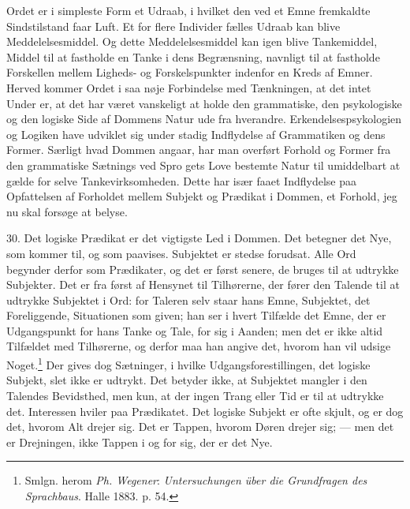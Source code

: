 \documentclass[12pt,a4paper]{book}
\newcommand{\opage}[1]{\marginnote{\footnotesize\textit{[#1]}}}
\begin{document}
Ordet er i simpleste Form et Udraab, i hvilket den ved et Emne
fremkaldte Sindstilstand faar Luft. Et for flere Individer fælles Udraab
kan blive Meddelelsesmiddel. Og dette Meddelelsesmiddel kan igen blive
Tankemiddel, Middel til at fastholde en Tanke i dens Begrænsning,
navnligt til at fastholde Forskellen mellem Ligheds- og Forskelspunkter
indenfor en Kreds af Emner. Herved kommer Ordet i saa nøje Forbindelse
med Tænkningen, at det intet Under er, at det har været vanskeligt at
holde den grammatiske, den psykologiske og den logiske Side af Dommens
Natur ude fra hverandre. Erkendelsespsykologien og Logiken have udviklet
sig under stadig Indflydelse af Grammatiken og dens Former. Særligt hvad
Dommen angaar, har man overført Forhold og Former fra den grammatiske
Sætnings ved Spro%
\opage{84}gets Love bestemte Natur til umiddelbart at gælde for
selve Tankevirksomheden. Dette har især faaet Indflydelse paa
Opfattelsen af Forholdet mellem Subjekt og Prædikat i Dommen, et
Forhold, jeg nu skal forsøge at belyse.

30. Det logiske Prædikat er det vigtigste Led i Dommen. Det betegner det
Nye, som kommer til, og som paavises. Subjektet er stedse forudsat. Alle
Ord begynder derfor som Prædikater, og det er først senere, de bruges
til at udtrykke Subjekter. Det er fra først af Hensynet til Tilhørerne,
der fører den Talende til at udtrykke Subjektet i Ord: for Taleren selv
staar hans Emne, Subjektet, det Foreliggende, Situationen som given; han
ser i hvert Tilfælde det Emne, der er Udgangspunkt for hans Tanke og
Tale, for sig i Aanden; men det er ikke altid Tilfældet med Tilhørerne,
og derfor maa han angive det, hvorom han vil udsige Noget.\footnote{Smlgn.
herom \emph{Ph. Wegener}: \emph{Untersuchungen über die Grundfragen des
Sprachbaus}. Halle 1883. p. 54.} Der gives dog Sætninger, i hvilke
Udgangsforestillingen, det logiske Subjekt, slet ikke er udtrykt. Det
betyder ikke, at Subjektet mangler i den Talendes Bevidsthed, men kun,
at der ingen Trang eller Tid er til at udtrykke det. Interessen hviler
paa Prædikatet. Det logiske Subjekt er ofte skjult, og er dog det,
hvorom Alt drejer sig. Det er Tappen, hvorom Døren drejer sig; --- men
det er Drejningen, ikke Tappen i og for sig, der er det Nye.
\end{document}
